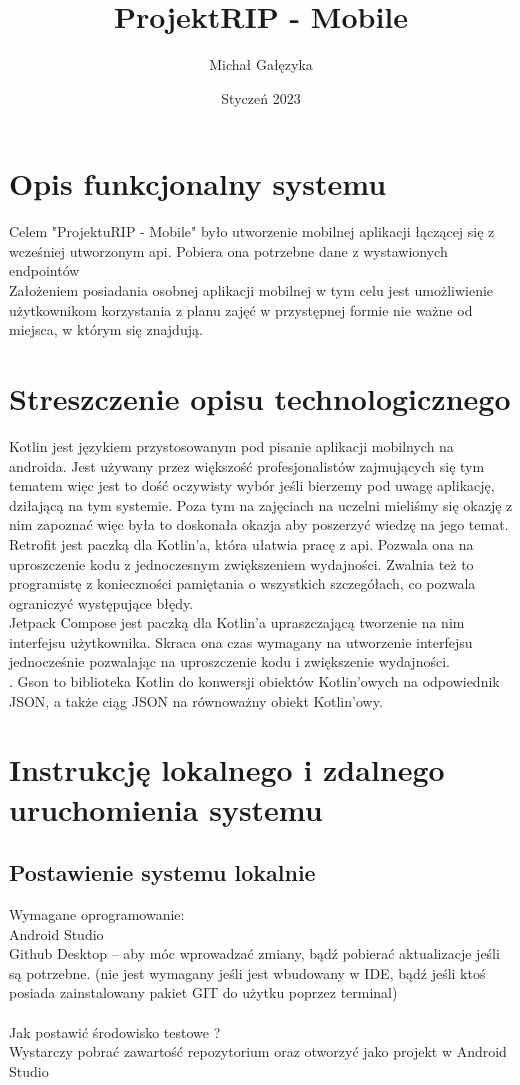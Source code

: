 \documentclass{article}
\title{Projekt\textunderscore RIP - Mobile}
\author{
Michał Gałęzyka
}
\date{Styczeń 2023}
\begin{document}
\maketitle

\section{Opis funkcjonalny systemu}
Celem "Projektu\textunderscore RIP - Mobile" było utworzenie mobilnej aplikacji łączącej się z wcześniej utworzonym api. Pobiera ona potrzebne dane z wystawionych endpointów 
\\
Założeniem posiadania osobnej aplikacji mobilnej w tym celu jest umożliwienie użytkownikom korzystania z planu zajęć w przystępnej formie nie ważne od miejsca, w którym się znajdują.

\section{Streszczenie opisu technologicznego}
Kotlin jest językiem przystosowanym pod pisanie aplikacji mobilnych na androida. Jest używany przez większość profesjonalistów zajmujących się tym tematem więc jest to dość oczywisty wybór jeśli bierzemy pod uwagę aplikację, dziłającą na tym systemie. Poza tym na zajęciach na uczelni mieliśmy się okazję z nim zapoznać więc była to doskonała okazja aby poszerzyć wiedzę na jego temat.
\\
Retrofit jest paczką dla Kotlin'a, która ułatwia pracę z api. Pozwala ona na uproszczenie kodu z jednoczesnym zwiększeniem wydajności. Zwalnia też to programistę z konieczności pamiętania o wszystkich szczegółach, co pozwala ograniczyć występujące błędy.
\\
Jetpack Compose jest paczką dla Kotlin'a upraszczającą tworzenie na nim interfejsu użytkownika. Skraca ona czas wymagany na utworzenie interfejsu jednocześnie pozwalając na uproszczenie kodu i zwiększenie wydajności.
\\.
Gson to biblioteka Kotlin do konwersji obiektów Kotlin'owych na odpowiednik JSON, a także ciąg JSON na równoważny obiekt Kotlin'owy.

\section{Instrukcję lokalnego i zdalnego uruchomienia systemu}
\subsection{Postawienie systemu lokalnie}
Wymagane oprogramowanie:\\
Android Studio\\
Github Desktop – aby móc wprowadzać zmiany, bądź pobierać aktualizacje jeśli są potrzebne. (nie jest wymagany  jeśli jest wbudowany w IDE, bądź jeśli ktoś posiada zainstalowany pakiet GIT do użytku poprzez terminal)\\\\
Jak postawić środowisko testowe ?\\
Wystarczy pobrać zawartość repozytorium oraz otworzyć jako projekt w Android Studio
    
\end{document}
